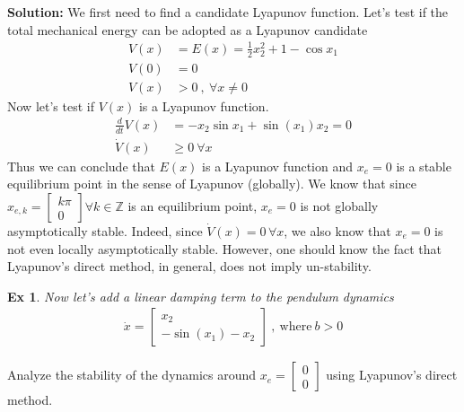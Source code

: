 \documentclass[twoside]{article}
\newtheorem{exmp}[theorem]{Ex}
\begin{document}
\textbf{Solution:} We first need to find a candidate Lyapunov function. Let's test if
the total mechanical energy can be adopted as a Lyapunov candidate
%
\begin{align*}
V(x) &= E(x) = \frac{1}{2} x_2^2 + 1 - \cos{x_1}  \\ 
V(0) &= 0 \\
V(x) &> 0 \ , \ \forall x \neq 0
\end{align*}
%
Now let's test if $V(x)$ is a Lyapunov function.
%
\begin{align*}
\frac{d}{dt} V(x) &= - x_2 \sin x_1 + \sin(x_1) x_2 = 0
\\
\dot{V}(x) &\geq 0 \ \forall x 
\end{align*}
%
Thus we can conclude that $E(x)$ is a Lyapunov function and $x_e = 0$
is a stable equilibrium point in the sense of Lyapunov (globally). We know that since 
$x_{e,k} = \begin{bmatrix} k \pi \\ 0 \end{bmatrix} \forall k \in \mathbb{Z}$
is an equilibrium point, $x_e = 0$ is not globally asymptotically stable. 
Indeed, since $\dot{V}(x) = 0 \, \forall x $, we also know 
that $x_e = 0$ is not even locally asymptotically stable. However, one should
know the fact that Lyapunov's direct method, in general, does not imply 
un-stability.

\begin{exmp}
    Now let's add a linear damping term to the pendulum dynamics
    \begin{align*}
    \dot{x} = \begin{bmatrix} x_2 \\ -\sin(x_1) - x_2 \end{bmatrix} \ , \ \mathrm{where} \ b > 0
\end{align*}
\end{exmp}
Analyze the stability of the dynamics around $x_e = \begin{bmatrix} 0 \\ 0 \end{bmatrix}$ using Lyapunov's direct method.
\end{document}
